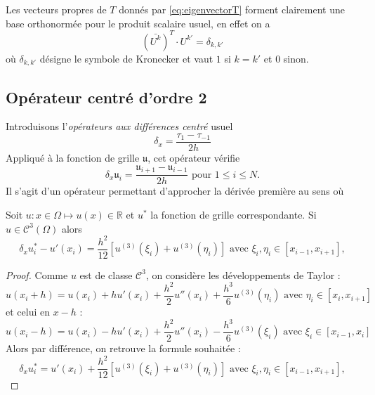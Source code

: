 Les vecteurs propres de $T$ donnés par \eqref{eq:eigenvectorT} forment clairement une base orthonormée pour le produit scalaire usuel, en effet on a 
\begin{equation}
(\bar{U^k})^T \cdot U^{k'} = \delta_{k,k'}
\end{equation}
où $\delta_{k,k'}$ désigne le symbole de Kronecker et vaut $1$ si $k=k'$ et $0$ sinon.













\subsection{Opérateur centré d'ordre 2}

Introduisons l'\textit{opérateurs aux différences centré} usuel
\begin{equation}
\delta_x = \dfrac{\tau_1 - \tau_{-1}}{2h}
\end{equation}
Appliqué à la fonction de grille $\mathfrak{u}$, cet opérateur vérifie 
\begin{equation}
\delta_x \mathfrak{u}_i = \dfrac{\mathfrak{u}_{i+1} - \mathfrak{u}_{i-1}}{2h} \text{ pour } 1 \leq i \leq N.
\end{equation}
Il s'agit d'un opérateur permettant d'approcher la dérivée première au sens où

\begin{proposition}
Soit $u: x \in \Omega \mapsto u(x) \in \mathbb{R}$ et $u^*$ la fonction de grille correspondante. Si $u \in \mathcal{C}^3 (\Omega)$ alors 
\begin{equation}
\delta_x u^*_i - u'(x_i) = \dfrac{h^2}{12} \left[ u^{(3)}(\xi_i) + u^{(3)}(\eta_i) \right]  \text{ avec } \xi_i , \eta_i \in [x_{i-1}, x_{i+1}],
\end{equation}
\end{proposition}

\begin{proof}
Comme $u$ est de classe $\mathcal{C}^3$, on considère les développements de Taylor :
\begin{equation}
u(x_i+h) = u(x_i) + h u'(x_i) + \dfrac{h^2}{2} u''(x_i) + \dfrac{h^3}{6} u^{(3)} (\eta_i) \text{ avec } \eta_i \in [x_i, x_{i+1}]
\end{equation}
et celui en $x-h$ :
\begin{equation}
u(x_i-h) = u(x_i) - h u'(x_i) + \dfrac{h^2}{2} u''(x_i) - \dfrac{h^3}{6}u^{(3)}(\xi_i) \text{ avec } \xi_i \in [x_{i-1}, x_{i}]
\end{equation}
Alors par différence, on retrouve la formule souhaitée : 
\begin{equation}
\delta_x u^*_i = u'(x_i) + \dfrac{h^2}{12} \left[ u^{(3)}(\xi_i) + u^{(3)}(\eta_i) \right]  \text{ avec } \xi_i, \eta_i \in [x_{i-1}, x_{i+1}],
\end{equation}
\end{proof}

